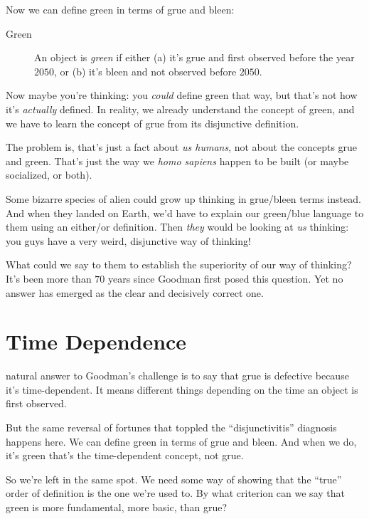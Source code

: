 \documentclass[justified]{tufte-book}
\theoremstyle{definition}
\theoremstyle{definition}
\theoremstyle{definition}
\theoremstyle{remark}
\begin{document}
Now we can define green in terms of grue and bleen:

\begin{description}
\item[Green]
An object is \emph{green} if either (a) it's grue and first observed
before the year \(2050\), or (b) it's bleen and not observed before
\(2050\).
\end{description}

Now maybe you're thinking: you \emph{could} define green that way, but
that's not how it's \emph{actually} defined. In reality, we already
understand the concept of green, and we have to learn the concept of
grue from its disjunctive definition.

The problem is, that's just a fact about \emph{us humans}, not about the
concepts grue and green. That's just the way we \emph{homo sapiens}
happen to be built (or maybe socialized, or both).

Some bizarre species of alien could grow up thinking in grue/bleen terms
instead. And when they landed on Earth, we'd have to explain our
green/blue language to them using an either/or definition. Then
\emph{they} would be looking at \emph{us} thinking: you guys have a very
weird, disjunctive way of thinking!

What could we say to them to establish the superiority of our way of
thinking? It's been more than \(70\) years since Goodman first posed
this question. Yet no answer has emerged as the clear and decisively
correct one.

\hypertarget{time-dependence}{%
\section*{Time Dependence}\label{time-dependence}}

 natural answer to Goodman's challenge is to say
that grue is defective because it's time-dependent. It means different
things depending on the time an object is first observed.

But the same reversal of fortunes that toppled the ``disjunctivitis''
diagnosis happens here. We can define green in terms of grue and bleen.
And when we do, it's green that's the time-dependent concept, not grue.

So we're left in the same spot. We need some way of showing that the
``true'' order of definition is the one we're used to. By what criterion
can we say that green is more fundamental, more basic, than grue?
\end{document}
